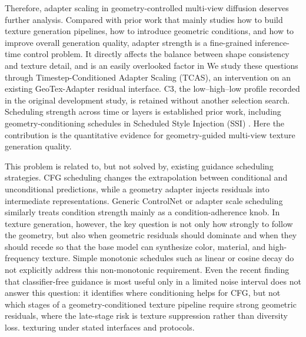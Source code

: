 \documentclass[times,twocolumn,final]{elsarticle}
\providecommand{\DIFadd}[1]{{\protect\color{blue} \sf #1}} %
\providecommand{\DIFdel}[1]{{\protect\color{red} \scriptsize #1}} %
\providecommand{\DIFaddbegin}{} %
\providecommand{\DIFaddend}{} %
\providecommand{\DIFdelbegin}{} %
\providecommand{\DIFdelend}{} %
\begin{document}
\DIFdelbegin \DIFdel{Therefore, adapter scaling in geometry-controlled multi-view diffusion deserves further analysis. Compared with prior work that mainly studies how to build texture generation pipelines, how to introduce geometric conditions, and how to improve overall generation quality, adapter strength is a fine-grained inference-time control problem. It directly affects the balance between shape consistency and texture detail, and is an easily overlooked factor in }\DIFdelend \DIFaddbegin \DIFadd{We study these questions through Timestep-Conditioned Adapter Scaling (TCAS), an intervention on an existing GeoTex-Adapter residual interface. C3, the low--high--low profile recorded in the original development study, is retained without another selection search. Scheduling strength across time or layers is established prior work, including geometry-conditioning schedules in Scheduled Style Injection (SSI) \cite{kulkarni2026ssi}. Here the contribution is the quantitative evidence for geometry-guided }\DIFaddend multi-view \DIFdelbegin \DIFdel{texture generation quality. }%

\DIFdel{This problem is related to, but not solved by, existing guidance scheduling strategies. CFG scheduling changes the extrapolation between conditional and unconditional predictions, while a geometry adapter injects residuals into intermediate representations. Generic ControlNet or adapter scale scheduling similarly treats condition strength mainly as a condition-adherence knob.
In texture generation, however, the key question is not only how strongly to follow the geometry, but also when geometric residuals should dominate and when they should recede so that the base model can synthesize color, material, and high-frequency texture. Simple monotonic schedules such as linear or cosine decay do not explicitly address this non-monotonic requirement. Even the recent finding that classifier-free guidance is most useful only in a limited noise interval \cite{kynkanniemi2024limited} does not answer this question: it identifies where conditioning helps for CFG, but not which stages of a geometry-conditioned texture pipeline require strong geometric residuals, where the late-stage risk is texture suppression rather than diversity loss. }\DIFdelend \DIFaddbegin \DIFadd{texturing under stated interfaces and protocols.
}\DIFaddend 
\end{document}
